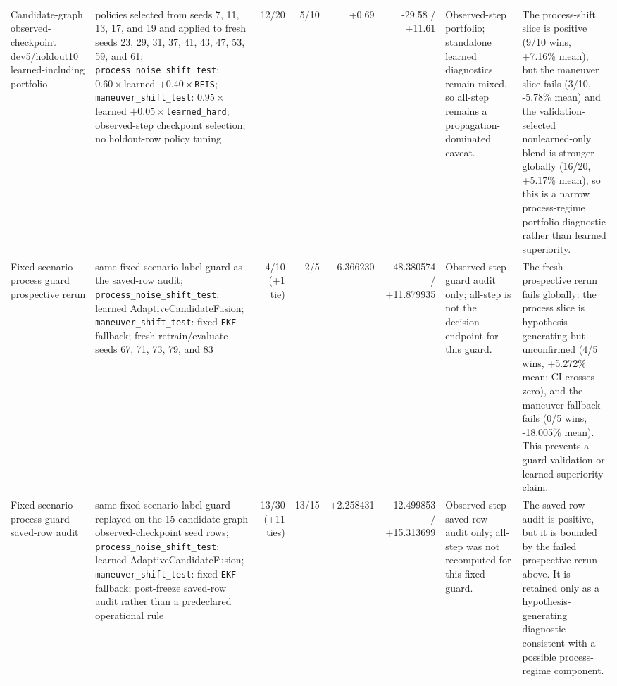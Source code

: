 \begin{table}[t]
{\begin{tabular}{p{3.4cm} p{5.4cm} r r r r p{3.8cm} p{5.2cm}}
Candidate-graph observed-checkpoint dev5/holdout10 learned-including portfolio & policies selected from seeds 7, 11, 13, 17, and 19 and applied to fresh seeds 23, 29, 31, 37, 41, 43, 47, 53, 59, and 61; \texttt{process\_noise\_shift\_test}: \(0.60\times\)learned \(+0.40\times\)\texttt{RFIS}; \texttt{maneuver\_shift\_test}: \(0.95\times\)learned \(+0.05\times\)\texttt{learned\_hard}; observed-step checkpoint selection; no holdout-row policy tuning & 12/20 & 5/10 & +0.69 & -29.58 / +11.61 & Observed-step portfolio; standalone learned diagnostics remain mixed, so all-step remains a propagation-dominated caveat. & The process-shift slice is positive (9/10 wins, +7.16\% mean), but the maneuver slice fails (3/10, -5.78\% mean) and the validation-selected nonlearned-only blend is stronger globally (16/20, +5.17\% mean), so this is a narrow process-regime portfolio diagnostic rather than learned superiority. \\
\addlinespace
Fixed scenario process guard prospective rerun & same fixed scenario-label guard as the saved-row audit; \texttt{process\_noise\_shift\_test}: learned AdaptiveCandidateFusion; \texttt{maneuver\_shift\_test}: fixed \texttt{EKF} fallback; fresh retrain/evaluate seeds 67, 71, 73, 79, and 83 & 4/10 (+1 tie) & 2/5 & -6.366230 & -48.380574 / +11.879935 & Observed-step guard audit only; all-step is not the decision endpoint for this guard. & The fresh prospective rerun fails globally: the process slice is hypothesis-generating but unconfirmed (4/5 wins, +5.272\% mean; CI crosses zero), and the maneuver fallback fails (0/5 wins, -18.005\% mean). This prevents a guard-validation or learned-superiority claim. \\
\addlinespace
Fixed scenario process guard saved-row audit & same fixed scenario-label guard replayed on the 15 candidate-graph observed-checkpoint seed rows; \texttt{process\_noise\_shift\_test}: learned AdaptiveCandidateFusion; \texttt{maneuver\_shift\_test}: fixed \texttt{EKF} fallback; post-freeze saved-row audit rather than a predeclared operational rule & 13/30 (+11 ties) & 13/15 & +2.258431 & -12.499853 / +15.313699 & Observed-step saved-row audit only; all-step was not recomputed for this fixed guard. & The saved-row audit is positive, but it is bounded by the failed prospective rerun above. It is retained only as a hypothesis-generating diagnostic consistent with a possible process-regime component. \\
\bottomrule
\end{tabular}%
}
\par\smallskip

\end{table}
